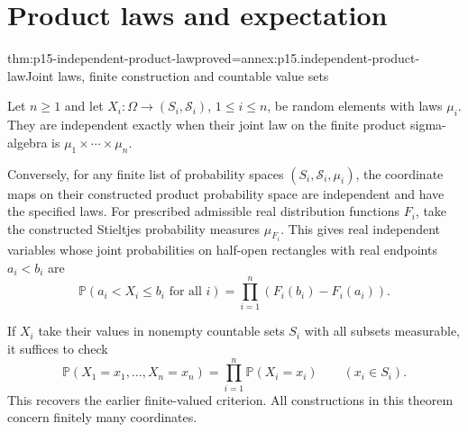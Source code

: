 \section{Product laws and expectation}
\label{sec:p15-independence-laws-expectation}

\begin{hbtheorem}{thm:p15-independent-product-law}{proved=annex:p15.independent-product-law}{Joint laws, finite construction and countable value sets}
\par\nobreak
Let \(n\geq1\) and let \(X_i:\Omega\to(S_i,\mathcal S_i)\), \(1\leq i\leq n\),
be random elements with laws \(\mu_i\). They are independent exactly
when their joint law on the finite product sigma-algebra is
\(\mu_1\times\cdots\times\mu_n\).

Conversely, for any finite list of probability spaces
\((S_i,\mathcal S_i,\mu_i)\), the coordinate maps on their constructed
product probability space are independent and have the specified laws.
For prescribed admissible real distribution functions \(F_i\), take
the constructed Stieltjes probability measures \(\mu_{F_i}\).
This gives real independent variables whose joint probabilities on
half-open rectangles with real endpoints \(a_i<b_i\) are
\[
 \mathbb P(a_i<X_i\leq b_i\text{ for all }i)
                       =\prod_{i=1}^n(F_i(b_i)-F_i(a_i)).
\]

If \(X_i\) take their values in nonempty countable sets \(S_i\)
with all subsets measurable, it suffices to check
\[
 \mathbb P(X_1=x_1,\ldots,X_n=x_n)
                     =\prod_{i=1}^n\mathbb P(X_i=x_i)
               \qquad(x_i\in S_i).
\]
This recovers the earlier finite-valued criterion. All constructions in
this theorem concern finitely many coordinates.
\end{hbtheorem}

